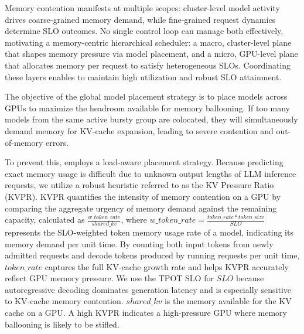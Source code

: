Memory contention manifests at multiple scopes: cluster-level model activity drives coarse-grained memory demand, while fine-grained request dynamics determine SLO outcomes. No single control loop can manage both effectively, motivating a memory-centric hierarchical scheduler: a macro, cluster-level plane that shapes memory pressure via model placement, and a micro, GPU-level plane that allocates memory per request to satisfy heterogeneous SLOs. Coordinating these layers enables \tool to maintain high utilization and robust SLO attainment.

 \label{sec:sch-global}

The objective of the global model placement strategy is to place models across GPUs to maximize the headroom available for memory ballooning.  If too many models from the same active bursty group are colocated, they will simultaneously demand memory for KV-cache expansion, leading to severe contention and out-of-memory errors.

To prevent this, \tool employs a load-aware placement strategy. Because predicting exact memory usage is difficult due to unknown output lengths of LLM inference requests, we utilize a robust heuristic referred to as the KV Pressure Ratio (KVPR). KVPR quantifies the intensity of memory contention on a GPU by comparing the aggregate urgency of memory demand against the remaining capacity, calculated as $\frac{w\_token\_rate}{shared\_kv}$, where $w\_token\_rate = \frac{token\_rate * token\_size}{SLO}$ represents the SLO-weighted token memory usage rate of a model,
indicating its memory demand per unit time. By counting both input tokens from newly admitted requests and decode tokens produced by running requests per unit time, $token\_rate$ captures the full KV-cache growth rate and helps KVPR accurately reflect GPU memory pressure. We use the TPOT SLO for $SLO$ because autoregressive decoding dominates generation latency and is especially sensitive to KV-cache memory contention. 
$shared\_kv$ is the memory available for the KV cache on a GPU.  A high KVPR indicates a high-pressure GPU where memory ballooning is likely to be stifled. 

